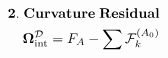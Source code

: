 \documentclass[preview]{standalone}
\begin{document}
\begin{align*}
\special{dvisvgm:raw <g id='unique000'>}\mathbf{2.\;Curvature\;Residual}\\\mathbf{\Omega}_{\text{int}}^{\mathcal{D}}=F_A-\sum\mathcal{F}_k^{(A_0)}\special{dvisvgm:raw </g>}
\end{align*}
\end{document}
